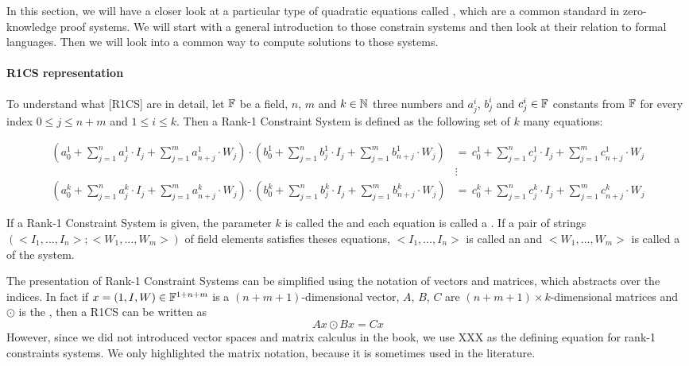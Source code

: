 In this section, we will have a closer look at a particular type of quadratic equations called , which are a common standard in zero-knowledge proof systems. We will start with a general introduction to those constrain systems and then look at their relation to formal languages. Then we will look into a common way to compute solutions to those systems. 

\paragraph{R1CS representation} To understand what  [R1CS] are in detail, let $\mathbb{F}$ be a field, $n$, $m$ and $k\in\mathbb{N}$ three numbers and $a_j^i$, $b_j^i$ and $c_j^i\in\mathbb{F}$ constants from $\mathbb{F}$ for every index $0\leq j \leq n+m$ and $1\leq i \leq k$. Then a Rank-1 Constraint System is defined as the following set of $k$ many equations: 

\begin{align*}
\label{R1CS}
\scriptstyle\left(a^1_0 + \sum_{j=1}^n a^1_j \cdot I_j + \sum_{j=1}^m a^1_{n+j} \cdot W_j  \right) \cdot 
\left(b^1_0 + \sum_{j=1}^n b^1_j \cdot I_j + \sum_{j=1}^m b^1_{n+j} \cdot W_j  \right) &=\, 
\scriptstyle c^1_0 + \sum_{j=1}^n c^1_j \cdot I_j + \sum_{j=1}^m c^1_{n+j} \cdot W_j\\
       & \vdots\\
\scriptstyle\left(a^k_0 + \sum_{j=1}^n a^k_j \cdot I_j + \sum_{j=1}^m a^k_{n+j} \cdot W_j  \right) \cdot 
\left(b^k_0 + \sum_{j=1}^n b^k_j \cdot I_j + \sum_{j=1}^m b^k_{n+j} \cdot W_j  \right) &=\, 
\scriptstyle c^k_0 + \sum_{j=1}^n c^k_j \cdot I_j + \sum_{j=1}^m c^k_{n+j} \cdot W_j       
\end{align*}

If a Rank-1 Constraint System is given, the parameter $k$ is called the  and each equation is called a . If a pair of strings $(<I_1,\ldots, I_n>; <W_1,\ldots,W_m>)$ of field elements satisfies theses equations, $<I_1,\ldots, I_n>$ is called an  and $<W_1,\ldots,W_m>$ is called a  of the system.

\begin{remark} The presentation of Rank-1 Constraint Systems can be simplified using the notation of vectors and matrices, which abstracts over the indices. In fact if $x= (1,I,W)\in \mathbb{F}^{1+n+m}$ is a $(n+m+1)$-dimensional vector, $A$, $B$, $C$ are $(n+m+1)\times k$-dimensional matrices and $\odot$ is the , then a R1CS can be written as
$$
Ax \odot Bx = Cx
$$
However,  since we did not introduced vector spaces and matrix calculus in the book, we use XXX as the defining equation for rank-1 constraints systems. We only highlighted the matrix notation, because it is sometimes used in the literature.
\end{remark}

